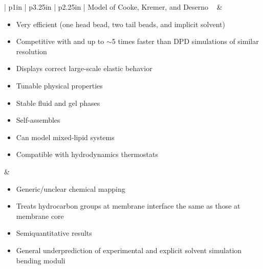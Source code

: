 \documentclass[9pt,bestpractices,pubversion]{livecoms}
\begin{document}
\begin{center}
\begin{longtable}[h]{| p{1in} | p{3.25in} | p{2.25in} |}
\hline
Model of Cooke, Kremer, and Deserno ~\cite{Cooke2005d} & \begin{minipage}[t]{\linewidth} \begin{itemize}[nosep,after=\strut] \item Very efficient (one head bead, two tail beads, and implicit solvent) \item Competitive with and up to $\sim$5 times faster than DPD simulations of similar resolution \item Displays correct large-scale elastic behavior \item Tunable physical properties \item Stable fluid and gel phases \item Self-assembles \item Can model mixed-lipid systems ~\cite{Cooke2005d} \item Compatible with hydrodynamics thermostats ~\cite{Wang2013} \end{itemize} \end{minipage} & \begin{minipage}[t]{\linewidth} \begin{itemize}[nosep,after=\strut] \item Generic/unclear chemical mapping \item Treats hydrocarbon groups at membrane interface the same as those at membrane core ~\cite{Brannigan2006} \item Semiquantitative results \item General underprediction of experimental and explicit solvent simulation bending moduli ~\cite{Bochicchio2016} \end{itemize} \end{minipage} \\
\hline
\end{longtable}
\end{center}
\nopagebreak[4]
\twocolumn
\nopagebreak[4]
\end{document}
